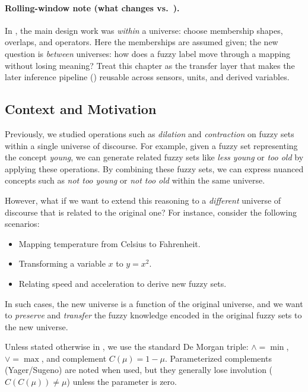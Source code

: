 \paragraph{Rolling-window note (what changes vs.\ ).}
In , the main design work was \emph{within} a universe: choose membership shapes, overlaps, and operators. Here the memberships are assumed given; the new question is \emph{between} universes: how does a fuzzy label move through a mapping without losing meaning? Treat this chapter as the transfer layer that makes the later inference pipeline () reusable across sensors, units, and derived variables.

\subsection{Context and Motivation}
\label{sec:fuzzyrelations_context_and_motivation}

Previously, we studied operations such as \emph{dilation} and \emph{contraction} on fuzzy sets within a single universe of discourse. For example, given a fuzzy set representing the concept \textit{young}, we can generate related fuzzy sets like \textit{less young} or \textit{too old} by applying these operations. By combining these fuzzy sets, we can express nuanced concepts such as \textit{not too young} or \textit{not too old} within the same universe.

However, what if we want to extend this reasoning to a \emph{different} universe of discourse that is related to the original one? For instance, consider the following scenarios:

\begin{itemize}
    \item Mapping temperature from Celsius to Fahrenheit.
    \item Transforming a variable \( x \) to \( y = x^2 \).
    \item Relating speed and acceleration to derive new fuzzy sets.
\end{itemize}

In such cases, the new universe is a function of the original universe, and we want to \emph{preserve} and \emph{transfer} the fuzzy knowledge encoded in the original fuzzy sets to the new universe.

\begin{tcolorbox}[summarybox, title={Operator defaults in this trilogy}]
Unless stated otherwise in , we use the standard De Morgan triple: \(\wedge=\min\), \(\vee=\max\), and complement \(C(\mu)=1-\mu\). Parameterized complements (Yager/Sugeno) are noted when used, but they generally lose involution (\(C(C(\mu))\neq \mu\)) unless the parameter is zero.
\end{tcolorbox}

